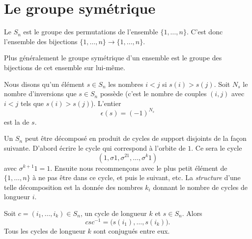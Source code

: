 
\section{Le groupe symétrique}

\begin{definition}
    Le  \( S_n\) est le groupe des permutations de l'ensemble \( \{ 1,\ldots,n \}\). C'est donc l'ensemble des bijections \( \{ 1,\ldots, n \}\to\{ 1,\ldots, n \}\).

    Plus généralement le groupe symétrique d'un ensemble est le groupe des bijections de cet ensemble sur lui-même.
\end{definition}

Nous disons qu'un élément \( s\in S_n\)  les nombres \( i<j\) si \( s(i)>s(j)\). Soit \( N_s\) le nombre d'inversions que \( s\in S_n\) possède (c'est le nombre de couples \( (i,j)\) avec \( i<j\) tels que \( s(i)>s(j)\)). L'entier
\begin{equation}
    \epsilon(s)=(-1)^{N_s}
\end{equation}
est la  de \( s\).

Un  \( S_n\) peut être décomposé en produit de cycles de support disjoints de la façon suivante. D'abord écrire le cycle qui correspond à l'orbite de \( 1\). Ce sera le cycle
\begin{equation}
    (1,\sigma 1,\sigma^21,\ldots, \sigma^k1)
\end{equation}
avec \( \sigma^{k+1}1=1\). Ensuite nous recommençons avec le plus petit élément de \( \{ 1,\ldots, n \}\) à ne pas être dans ce cycle, et puis le suivant, etc. La \emph{structure} d'une telle décomposition est la donnée des nombres \( k_i\) donnant le nombre de cycles de longueur \( i\).

\begin{lemma}        \label{LemmvZFWP}
    Soit \( c=(i_1,\ldots, i_k)\in S_n\), un cycle de longueur \( k\) et \( s\in S_n\). Alors
    \begin{equation}
        csc^{-1}=\big( s(i_1),\ldots, s(i_k) \big).
    \end{equation}
    Tous les cycles de longueur \( k\) sont conjugués entre eux.
\end{lemma}

